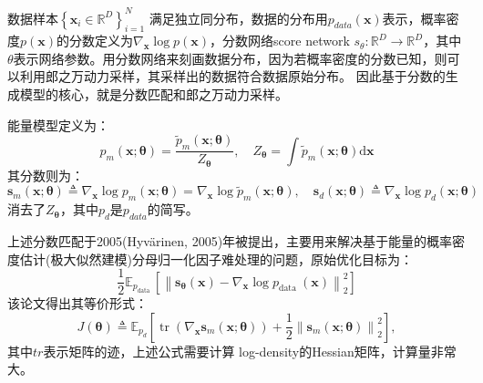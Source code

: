 
数据样本$\left\{\mathbf{x}_i \in \mathbb{R}^D\right\}_{i=1}^N$ 满足独立同分布，数据的分布用$p_{data}(\mathbf{x})$表示，概率密度$p(\mathbf{x})$的分数定义为$\nabla_{\mathbf{x}} \log p(\mathbf{x})$，分数网络score network $s_{\theta}:\mathbb{R}^D \rightarrow \mathbb{R}^D$，其中$\theta$表示网络参数。用分数网络来刻画数据分布，因为若概率密度的分数已知，则可以利用郎之万动力采样，其采样出的数据符合数据原始分布。 因此基于分数的生成模型的核心，就是分数匹配和郎之万动力采样。

能量模型定义为：
\begin{equation}
p_m(\mathbf{x} ; \boldsymbol{\theta})=\frac{\tilde{p}_m(\mathbf{x} ; \boldsymbol{\theta})}{Z_{\boldsymbol{\theta}}}, \quad Z_{\boldsymbol{\theta}}=\int \tilde{p}_m(\mathbf{x} ; \boldsymbol{\theta}) \mathrm{d} \mathbf{x}
\end{equation}
其分数则为：
\begin{equation}
\mathbf{s}_m(\mathbf{x} ; \boldsymbol{\theta}) \triangleq \nabla_{\mathbf{x}} \log p_m(\mathbf{x} ; \boldsymbol{\theta})=\nabla_{\mathbf{x}} \log \tilde{p}_m(\mathbf{x} ; \boldsymbol{\theta}), \quad  \mathbf{s}_d(\mathbf{x} ; \boldsymbol{\theta}) \triangleq \nabla_{\mathbf{x}} \log p_d(\mathbf{x} ; \boldsymbol{\theta})
\end{equation}
消去了$Z_{\boldsymbol{\theta}}$，其中$p_d$是$p_{data}$的简写。

上述分数匹配于2005(Hyvärinen, 2005)年被提出，主要用来解决基于能量的概率密度估计(极大似然建模)分母归一化因子难处理的问题，原始优化目标为：
\begin{equation}
\frac{1}{2} \mathbb{E}_{p_{\text {data }}}\left[\left\|\mathbf{s}_{\boldsymbol{\theta}}(\mathbf{x})-\nabla_{\mathbf{x}} \log p_{\text {data }}(\mathbf{x})\right\|_2^2\right]
\end{equation}
该论文得出其等价形式：
\begin{equation}
J(\boldsymbol{\theta}) \triangleq \mathbb{E}_{p_d}\left[\operatorname{tr}\left(\nabla_{\mathbf{x}} \mathbf{s}_m(\mathbf{x} ; \boldsymbol{\theta})\right)+\frac{1}{2}\left\|\mathbf{s}_m(\mathbf{x} ; \boldsymbol{\theta})\right\|_2^2\right],
\end{equation}
其中$tr$表示矩阵的迹，上述公式需要计算 log-density的Hessian矩阵，计算量非常大。

